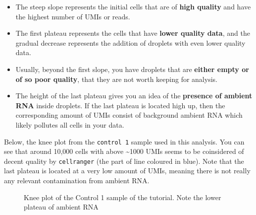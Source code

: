 \documentclass[
  letterpaper,
  DIV=11,
  numbers=noendperiod]{scrartcl}
\providecommand{\tightlist}{%
  \setlength{\itemsep}{0pt}\setlength{\parskip}{0pt}}\usepackage{longtable,booktabs,array}
\begin{document}
\begin{itemize}
\tightlist
\item
  The steep slope represents the initial cells that are of \textbf{high
  quality} and have the highest number of UMIs or reads.
\item
  The first plateau represents the cells that have \textbf{lower quality
  data}, and the gradual decrease represents the addition of droplets
  with even lower quality data.
\item
  Usually, beyond the first slope, you have droplets that are
  \textbf{either empty or of so poor quality}, that they are not worth
  keeping for analysis.
\item
  The height of the last plateau gives you an idea of the
  \textbf{presence of ambient RNA} inside droplets. If the last plateau
  is located high up, then the corresponding amount of UMIs consist of
  background ambient RNA which likely pollutes all cells in your data.
\end{itemize}

Below, the knee plot from the \texttt{control\ 1} sample used in this
analysis. You can see that around 10,000 cells with above
\textasciitilde1000 UMIs seems to be coinsidered of decent quality by
\texttt{cellranger} (the part of line coloured in blue). Note that the
last plateau is located at a very low amount of UMIs, meaning there is
not really any relevant contamination from ambient RNA.

\begin{figure}


\caption{\label{fig-knee}Knee plot of the Control 1 sample of the
tutorial. Note the lower plateau of ambient RNA}

\end{figure}%
\end{document}
